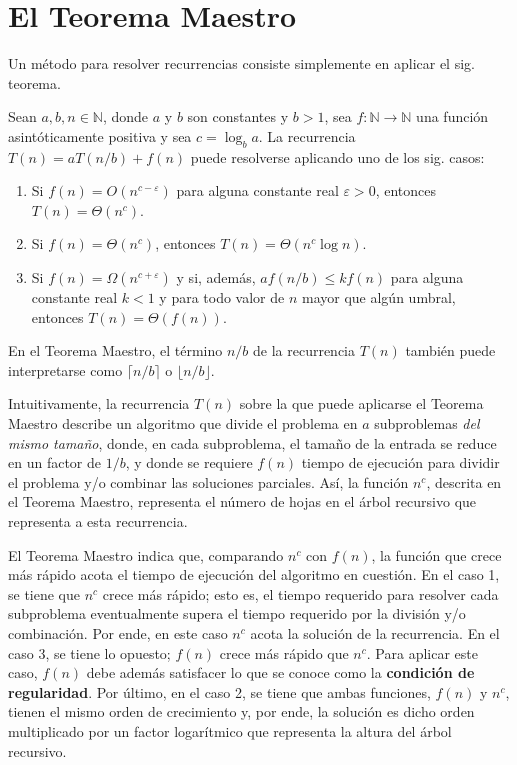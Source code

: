 \section{El Teorema Maestro}

Un método para resolver recurrencias consiste simplemente en aplicar el sig. teorema.

\begin{thm}
  Sean \(a,b,n\in\mathbb{N}\), donde \(a\) y \(b\) son constantes y \(b>1\), sea \(f:\mathbb{N}\to\mathbb{N}\) una función asintóticamente positiva y sea \(c=\log_{b}a\). 
  La recurrencia \(T(n)=aT(n/b)+f(n)\) puede resolverse aplicando uno de los sig. casos:
  \begin{enumerate}
    \item Si \(f(n)=O(n^{c-\varepsilon})\) para alguna constante real $\varepsilon>0$, entonces \(T(n)=\Theta(n^{c})\).
    \item Si \(f(n)=\Theta(n^c)\), entonces \(T(n)=\Theta(n^{c}\log{n})\).
    \item Si \(f(n)=\Omega(n^{c+\varepsilon})\) y si, además, \(af(n/b)\leq kf(n)\) para alguna constante real \(k<1\) y para todo valor de \(n\) mayor que algún umbral, entonces \(T(n)=\Theta(f(n))\).
  \end{enumerate}
\end{thm}

\begin{rem}
  En el Teorema Maestro, el término \(n/b\) de la recurrencia \(T(n)\) también puede interpretarse como \(\lceil n/b\rceil\) o \(\lfloor n/b\rfloor\).
\end{rem}

Intuitivamente, la recurrencia \(T(n)\) sobre la que puede aplicarse el Teorema Maestro describe un algoritmo que divide el problema en \(a\) subproblemas \emph{del mismo tamaño}, donde, en cada subproblema, el tamaño de la entrada se reduce en un factor de \(1/b\), y donde se requiere \(f(n)\) tiempo de ejecución para dividir el problema y/o combinar las soluciones parciales.
Así, la función \(n^c\), descrita en el Teorema Maestro, representa el número de hojas en el árbol recursivo que representa a esta recurrencia.

El Teorema Maestro indica que, comparando \(n^c\) con \(f(n)\), la función que crece más rápido acota el tiempo de ejecución del algoritmo en cuestión.
En el caso 1, se tiene que \(n^c\) crece más rápido; esto es, el tiempo requerido para resolver cada subproblema eventualmente supera el tiempo requerido por la división y/o combinación.
Por ende, en este caso \(n^c\) acota la solución de la recurrencia.
En el caso 3, se tiene lo opuesto; \(f(n)\) crece más rápido que \(n^c\).
Para aplicar este caso, \(f(n)\) debe además satisfacer lo que se conoce como
la \textbf{condición de regularidad}.
Por último, en el caso 2, se tiene que ambas funciones, \(f(n)\) y \(n^c\), tienen el mismo orden de crecimiento y, por ende, la solución es dicho orden multiplicado por un factor logarítmico que representa la altura del árbol recursivo.

